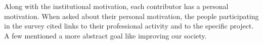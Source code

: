 \documentclass[letterpaper, 10 pt, conference]{ieeeconf}  %
\begin{document}
Along with the institutional motivation, each contributor has a personal motivation.
When asked about their personal motivation, the people participating in the survey cited links to their professional activity and to the specific project.
A few mentioned a more abstract goal like improving our society.

\end{document}
